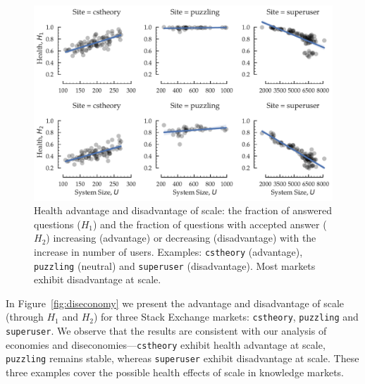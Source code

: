 \begin{figure}[hbt]
\vspace{-0.5\baselineskip}
\centering
\includegraphics[scale=0.38]{Figures/Size_vs_Health.pdf}
\vspace{-2\baselineskip}
\caption{Health advantage and disadvantage of scale: the fraction of answered questions ($H_1$) and the fraction of questions with accepted answer ($H_2$) increasing (advantage) or decreasing (disadvantage) with the increase in number of users. Examples: \texttt{cstheory} (advantage), \texttt{puzzling} (neutral) and \texttt{superuser} (disadvantage). Most markets exhibit disadvantage at scale.}
\vspace{-\baselineskip}
\label{fig:health}
\end{figure}

In Figure~\ref{fig:diseconomy} we present the advantage and disadvantage of scale (through $H_1$ and $H_2$) for three Stack Exchange markets: \texttt{cstheory}, \texttt{puzzling} and \texttt{superuser}. We observe that the results are consistent with our analysis of economies and diseconomies---\texttt{cstheory} exhibit health advantage at scale, \texttt{puzzling} remains stable, whereas \texttt{superuser} exhibit disadvantage at scale. These three examples cover the possible health effects of scale in knowledge markets. 


